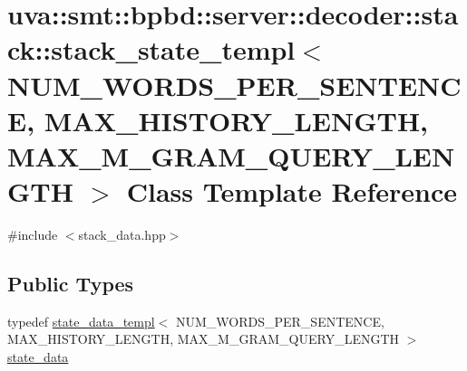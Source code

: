 \hypertarget{classuva_1_1smt_1_1bpbd_1_1server_1_1decoder_1_1stack_1_1stack__state__templ}{}\section{uva\+:\+:smt\+:\+:bpbd\+:\+:server\+:\+:decoder\+:\+:stack\+:\+:stack\+\_\+state\+\_\+templ$<$ N\+U\+M\+\_\+\+W\+O\+R\+D\+S\+\_\+\+P\+E\+R\+\_\+\+S\+E\+N\+T\+E\+N\+C\+E, M\+A\+X\+\_\+\+H\+I\+S\+T\+O\+R\+Y\+\_\+\+L\+E\+N\+G\+T\+H, M\+A\+X\+\_\+\+M\+\_\+\+G\+R\+A\+M\+\_\+\+Q\+U\+E\+R\+Y\+\_\+\+L\+E\+N\+G\+T\+H $>$ Class Template Reference}
\label{classuva_1_1smt_1_1bpbd_1_1server_1_1decoder_1_1stack_1_1stack__state__templ}


{\ttfamily \#include $<$stack\+\_\+data.\+hpp$>$}

\subsection*{Public Types}
\begin{DoxyCompactItemize}
\item 
typedef \hyperlink{structuva_1_1smt_1_1bpbd_1_1server_1_1decoder_1_1stack_1_1state__data__templ}{state\+\_\+data\+\_\+templ}$<$ N\+U\+M\+\_\+\+W\+O\+R\+D\+S\+\_\+\+P\+E\+R\+\_\+\+S\+E\+N\+T\+E\+N\+C\+E, M\+A\+X\+\_\+\+H\+I\+S\+T\+O\+R\+Y\+\_\+\+L\+E\+N\+G\+T\+H, M\+A\+X\+\_\+\+M\+\_\+\+G\+R\+A\+M\+\_\+\+Q\+U\+E\+R\+Y\+\_\+\+L\+E\+N\+G\+T\+H $>$ \hyperlink{classuva_1_1smt_1_1bpbd_1_1server_1_1decoder_1_1stack_1_1stack__state__templ_a94773592dfe5327c6cc5b76b47c571df}{state\+\_\+data}
\end{DoxyCompactItemize}
